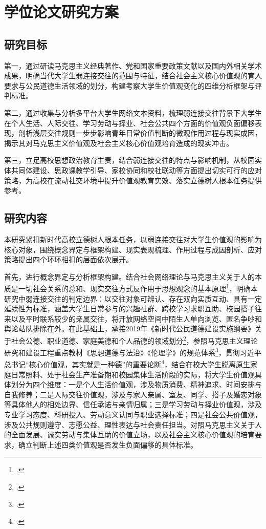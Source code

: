 \section{学位论文研究方案}

\subsection{研究目标}

第一，通过研读马克思主义经典著作、党和国家重要政策文献以及国内外相关学术成果，明确当代大学生弱连接交往的范围与特征，结合社会主义核心价值观的育人要求与公民道德生活领域的划分，构建考察大学生价值观变化的四维分析框架与评判标准。

第二，通过收集与分析多平台大学生网络文本资料，梳理弱连接交往背景下大学生在个人生活、人际交往、学习劳动与择业、社会公共四个方面的价值观负面偏移表现，剖析浅层交往规则一步步影响青年日常价值判断的微观作用过程与现实成因，揭示其对马克思主义价值观及社会主义核心价值观培育造成的现实冲击。

第三，立足高校思想政治教育主责，结合弱连接交往的特点与影响机制，从校园实体共同体建设、思政课教学引导、家校协同和校社联动等方面提出切实可行的应对策略，为高校在流动社交环境中提升价值观教育实效、落实立德树人根本任务提供参考。

\subsection{研究内容}

本研究紧扣新时代高校立德树人根本任务，以弱连接交往对大学生价值观的影响为核心对象，围绕概念界定与框架构建、现实表现梳理、作用过程与成因剖析、应对策略提出四个环环相扣的层面依次展开。

首先，进行概念界定与分析框架构建。结合社会网络理论与马克思主义关于人的本质是一切社会关系的总和、现实交往方式反作用于思想观念的基本原理\footcite{sizheng2018}，明确本研究中弱连接交往的判定边界：以交往对象可辨认、存在双向实质互动、具有一定延续性为标准，涵盖大学生日常参与的兴趣社群、跨校学习求职互助、校园搭子往来以及平时联系较少的亲属交往，将开放网络空间中陌生人单向浏览、匿名争吵和舆论站队排除在外。在此基础上，承接2019年《新时代公民道德建设实施纲要》关于社会公德、职业道德、家庭美德和个人品德的领域划分\footcite{gangyao2019}，参照马克思主义理论研究和建设工程重点教材《思想道德与法治》《伦理学》的规范体系\footcite{sixiangdaode2023,lunlixue2020}，贯彻习近平总书记“核心价值观，其实就是一种德”的重要论断\footcite{xi2017wenhua}，结合在校大学生脱离原生家庭日常照料、处于社会生产准备期和校园集体生活阶段的实际，将大学生价值观具体划分为四个维度：一是个人生活价值观，涉及物质消费、精神追求、时间安排与自我修养；二是人际交往价值观，涉及与家人亲属、室友、同学、搭子及婚恋对象等具体他人的相处边界、信任承诺与亲情归属；三是学习劳动与择业价值观，涉及专业学习态度、科研投入、劳动意义认同与职业选择标准；四是社会公共价值观，涉及公共规则遵守、志愿公益、理性表达与社会责任担当。对照马克思主义关于人的全面发展、诚实劳动与集体互助的价值立场，以及社会主义核心价值观的培育要求，确立判断上述四类价值观是否发生负面偏移的具体标准。

